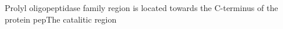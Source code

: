 Prolyl oligopeptidase family region is located towards the C-terminus of the protein pepThe catalitic region 
